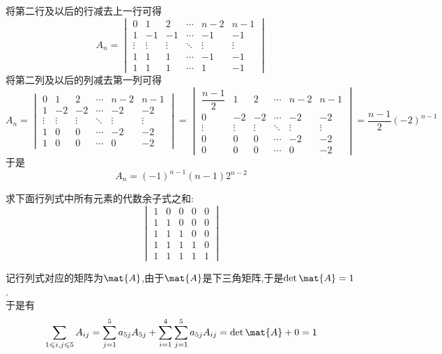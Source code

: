 \documentclass{ctexart}
\begin{document}
\begin{solution}
    将第二行及以后的行减去上一行可得
    \[A_n=\begin{vmatrix}
        0&1&2&\cdots&n-2&n-1\\
        1&-1&-1&\cdots&-1&-1\\
        \vdots&\vdots&\vdots&\ddots&\vdots&\vdots\\
        1&1&1&\cdots&-1&-1\\
        1&1&1&\cdots&1&-1
    \end{vmatrix}\]
    将第二列及以后的列减去第一列可得
    \[A_n=\begin{vmatrix}
        0&1&2&\cdots&n-2&n-1\\
        1&-2&-2&\cdots&-2&-2\\
        \vdots&\vdots&\vdots&\ddots&\vdots&\vdots\\
        1&0&0&\cdots&-2&-2\\
        1&0&0&\cdots&0&-2
    \end{vmatrix}=\begin{vmatrix}
        \dfrac{n-1}{2}&1&2&\cdots&n-2&n-1\\
        0&-2&-2&\cdots&-2&-2\\
        \vdots&\vdots&\vdots&\ddots&\vdots&\vdots\\
        0&0&0&\cdots&-2&-2\\
        0&0&0&\cdots&0&-2
    \end{vmatrix}=\dfrac{n-1}{2}(-2)^{n-1}\]
    于是
    \[A_n=(-1)^{n-1}(n-1)2^{n-2}\]
\end{solution}
\begin{homework}[4(13')]
    求下面行列式中所有元素的代数余子式之和:
    \[\begin{vmatrix}
        1&0&0&0&0\\
        1&1&0&0&0\\
        1&1&1&0&0\\
        1&1&1&1&0\\
        1&1&1&1&1
    \end{vmatrix}\]
\end{homework}
\begin{solution}
    记行列式对应的矩阵为$\mat{A}$,由于$\mat{A}$是下三角矩阵,于是$\det\mat{A}=1$.\\
    于是有
    \[\sum_{1\leqslant i,j\leqslant 5}A_{ij}=\sum_{j=1}^{5}a_{5j}A_{5j}+\sum_{i=1}^{4}\sum_{j=1}^{5}a_{5j}A_{ij}=\det\mat{A}+0=1\]
\end{solution}
\end{document}
